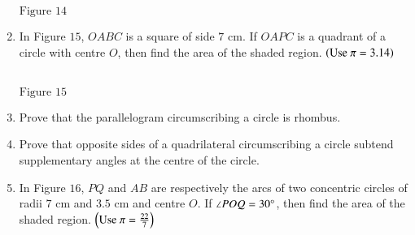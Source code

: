 \documentclass[journal,12pt,onecolumn]{IEEEtran}
\theoremstyle{remark}
\begin{document}
\begin{enumerate}
\begin{figure}[ht]
\end{figure}
\begin{center}
$\text{Figure } 14$
\end{center}
\item In Figure $15$, $OABC$ is a square of side $7 \text{ cm}$. If $OAPC$ is a quadrant of a circle with centre $O$, then find the area of the shaded region. $\brak{\text{Use } \pi = 3.14}$\\
\\
\begin{figure}[ht]
\centering
{}
\end{figure}
\begin{center}
$\text{Figure } 15$
\end{center}

\item Prove that the parallelogram circumscribing a circle is rhombus.\\
\item Prove that opposite sides of a quadrilateral circumscribing a circle subtend supplementary angles at the centre of the circle.\\
\item In Figure $16$, $PQ$ and $AB$ are respectively the arcs of two concentric circles of radii $7\text{ cm}$ and $3.5\text{ cm}$ and centre $O$. If $\angle POQ = 30\degree$, then find the area of the shaded region. $\brak{\text{Use } \pi = \frac{22}{7}}$
\begin{figure}[ht]
\centering
\begin{tikzpicture}[rotate = -20, scale = 0.4]


\end{tikzpicture}
\end{figure}
\end{enumerate}
\end{document}
